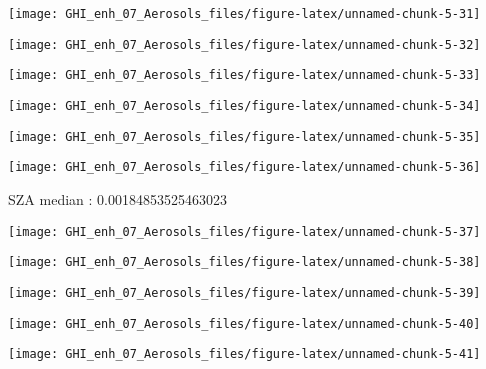 \documentclass[
  10pt,
  a4paper,oneside]{article}
\begin{document}
\begin{center}\texttt{[image: GHI\_enh\_07\_Aerosols\_files/figure-latex/unnamed-chunk-5-31]} \end{center}

\begin{center}\texttt{[image: GHI\_enh\_07\_Aerosols\_files/figure-latex/unnamed-chunk-5-32]} \end{center}

\begin{center}\texttt{[image: GHI\_enh\_07\_Aerosols\_files/figure-latex/unnamed-chunk-5-33]} \end{center}

\begin{center}\texttt{[image: GHI\_enh\_07\_Aerosols\_files/figure-latex/unnamed-chunk-5-34]} \end{center}

\begin{center}\texttt{[image: GHI\_enh\_07\_Aerosols\_files/figure-latex/unnamed-chunk-5-35]} \end{center}

\begin{center}\texttt{[image: GHI\_enh\_07\_Aerosols\_files/figure-latex/unnamed-chunk-5-36]} \end{center}

SZA median : 0.00184853525463023

\begin{center}\texttt{[image: GHI\_enh\_07\_Aerosols\_files/figure-latex/unnamed-chunk-5-37]} \end{center}

\begin{center}\texttt{[image: GHI\_enh\_07\_Aerosols\_files/figure-latex/unnamed-chunk-5-38]} \end{center}

\begin{center}\texttt{[image: GHI\_enh\_07\_Aerosols\_files/figure-latex/unnamed-chunk-5-39]} \end{center}

\begin{center}\texttt{[image: GHI\_enh\_07\_Aerosols\_files/figure-latex/unnamed-chunk-5-40]} \end{center}

\begin{center}\texttt{[image: GHI\_enh\_07\_Aerosols\_files/figure-latex/unnamed-chunk-5-41]} \end{center}
\end{document}
